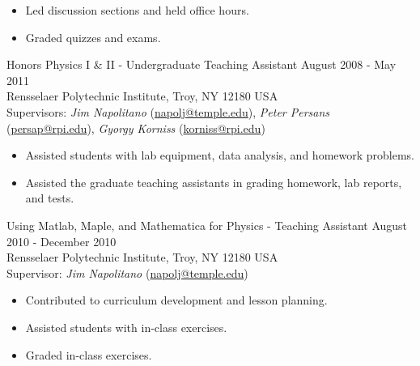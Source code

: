 \begin{itemize}[leftmargin=12pt]
\item Led discussion sections and held office hours.
\item Graded quizzes and exams.
\end{itemize}
Honors Physics I \& II - Undergraduate Teaching Assistant \hfill August 2008 - May 2011\\
Rensselaer Polytechnic Institute, Troy, NY 12180 USA\\
Supervisors: {\sl Jim Napolitano} (\href{mailto:napolj@temple.edu}{napolj@temple.edu}), {\sl Peter Persans} (\href{mailto:persap@rpi.edu}{persap@rpi.edu}), {\sl Gyorgy Korniss} (\href{mailto:korniss@rpi.edu}{korniss@rpi.edu})
\begin{itemize}[leftmargin=12pt]
\item Assisted students with lab equipment, data analysis, and homework problems.
\item Assisted the graduate teaching assistants in grading homework, lab reports, and tests.
\end{itemize}
Using Matlab, Maple, and Mathematica for Physics - Teaching Assistant \hfill August 2010 - December 2010\\
Rensselaer Polytechnic Institute, Troy, NY 12180 USA\\
Supervisor: {\sl Jim Napolitano} (\href{mailto:napolj@temple.edu}{napolj@temple.edu})
\begin{itemize}[leftmargin=12pt]
\item Contributed to curriculum development and lesson planning.
\item Assisted students with in-class exercises.
\item Graded in-class exercises.
\end{itemize}